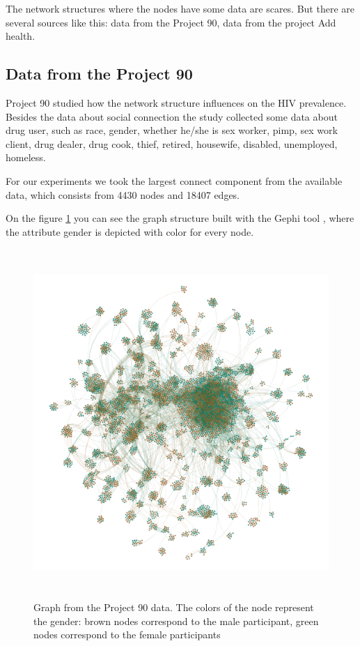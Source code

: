 \documentclass[12pt]{report}
\begin{document}
The network structures where the nodes have some data are scares. But there are several sources like this: data from the Project 90\cite{Project90}, data from the project Add health\cite{Addhealth}. 

\subsection{Data from the Project 90}
Project 90 \cite{Project90} studied how the network structure influences on the HIV prevalence. Besides the data about social connection the study collected some data about drug user, such as race, gender, whether he/she is sex worker, pimp, sex work client, drug dealer, drug cook, thief, retired, housewife, disabled, unemployed, homeless.


For our experiments we took the largest connect component from the available data, which consists from 4430 nodes and 18407 edges.

On the figure \ref{fig:project90gender} you can see the graph structure built with the Gephi tool \cite{GEPHI}, where the attribute gender is depicted with color for every node.
\begin{figure}[ht]
    \centering
    \includegraphics[height=500px]{project90gender}
    \caption{Graph from the Project 90 data. The colors of the node represent the gender: brown nodes correspond to the male participant, green nodes correspond to the female participants}
    \label{fig:project90gender}
\end{figure}
\end{document}
